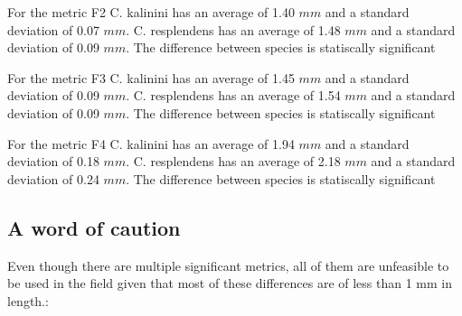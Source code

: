For the metric F2 C. kalinini has an average of 1.40 $mm$ and a standard deviation of  0.07 $mm$. C. resplendens has an average of 1.48 $mm$ and a standard deviation of  0.09 $mm$. The difference between species is statiscally significant


For the metric F3 C. kalinini has an average of 1.45 $mm$ and a standard deviation of  0.09 $mm$. C. resplendens has an average of 1.54 $mm$ and a standard deviation of  0.09 $mm$. The difference between species is statiscally significant


For the metric F4 C. kalinini has an average of 1.94 $mm$ and a standard deviation of  0.18 $mm$. C. resplendens has an average of 2.18 $mm$ and a standard deviation of  0.24 $mm$. The difference between species is statiscally significant


\newpage

\subsection{A word of caution}

Even though there are multiple significant metrics, all of them are unfeasible to be used in the field given that most of these differences are of less than 1 mm in length.:

\newpage

